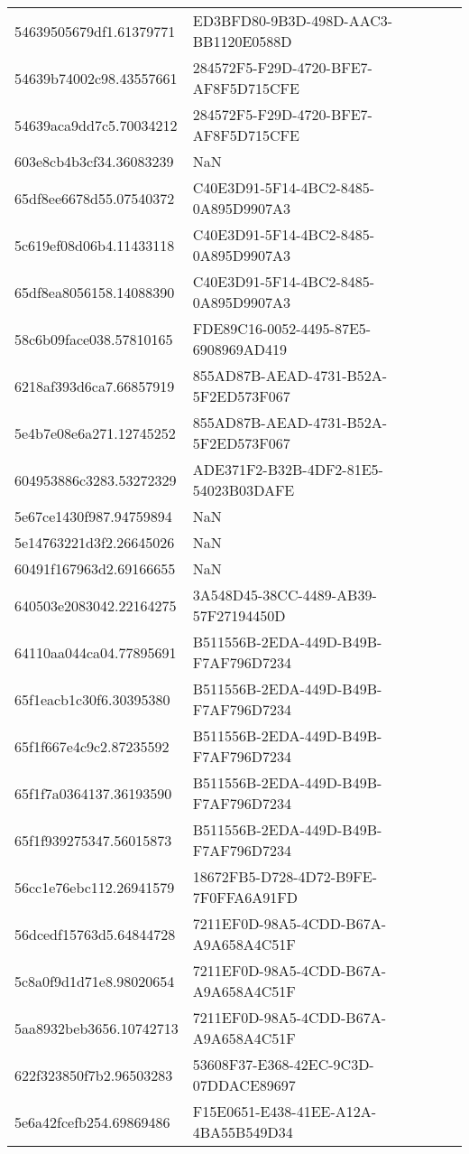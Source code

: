 \begin{tabular}{ll}
54639505679df1.61379771 & ED3BFD80-9B3D-498D-AAC3-BB1120E0588D \\
54639b74002c98.43557661 & 284572F5-F29D-4720-BFE7-AF8F5D715CFE \\
54639aca9dd7c5.70034212 & 284572F5-F29D-4720-BFE7-AF8F5D715CFE \\
603e8cb4b3cf34.36083239 & NaN \\
65df8ee6678d55.07540372 & C40E3D91-5F14-4BC2-8485-0A895D9907A3 \\
5c619ef08d06b4.11433118 & C40E3D91-5F14-4BC2-8485-0A895D9907A3 \\
65df8ea8056158.14088390 & C40E3D91-5F14-4BC2-8485-0A895D9907A3 \\
58c6b09face038.57810165 & FDE89C16-0052-4495-87E5-6908969AD419 \\
6218af393d6ca7.66857919 & 855AD87B-AEAD-4731-B52A-5F2ED573F067 \\
5e4b7e08e6a271.12745252 & 855AD87B-AEAD-4731-B52A-5F2ED573F067 \\
604953886c3283.53272329 & ADE371F2-B32B-4DF2-81E5-54023B03DAFE \\
5e67ce1430f987.94759894 & NaN \\
5e14763221d3f2.26645026 & NaN \\
60491f167963d2.69166655 & NaN \\
640503e2083042.22164275 & 3A548D45-38CC-4489-AB39-57F27194450D \\
64110aa044ca04.77895691 & B511556B-2EDA-449D-B49B-F7AF796D7234 \\
65f1eacb1c30f6.30395380 & B511556B-2EDA-449D-B49B-F7AF796D7234 \\
65f1f667e4c9c2.87235592 & B511556B-2EDA-449D-B49B-F7AF796D7234 \\
65f1f7a0364137.36193590 & B511556B-2EDA-449D-B49B-F7AF796D7234 \\
65f1f939275347.56015873 & B511556B-2EDA-449D-B49B-F7AF796D7234 \\
56cc1e76ebc112.26941579 & 18672FB5-D728-4D72-B9FE-7F0FFA6A91FD \\
56dcedf15763d5.64844728 & 7211EF0D-98A5-4CDD-B67A-A9A658A4C51F \\
5c8a0f9d1d71e8.98020654 & 7211EF0D-98A5-4CDD-B67A-A9A658A4C51F \\
5aa8932beb3656.10742713 & 7211EF0D-98A5-4CDD-B67A-A9A658A4C51F \\
622f323850f7b2.96503283 & 53608F37-E368-42EC-9C3D-07DDACE89697 \\
5e6a42fcefb254.69869486 & F15E0651-E438-41EE-A12A-4BA55B549D34 \\

\end{tabular}
